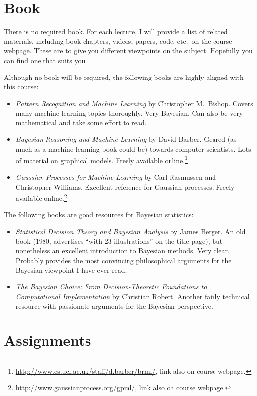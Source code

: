 \documentclass{article}
\begin{document}
\section*{Book}

There is no required book. For each lecture, I will provide a list of
related materials, including book chapters, videos, papers, code,
etc.\ on the course webpage.  These are to give you different
viewpoints on the subject.  Hopefully you can find one that suits you.

Although no book will be required, the following books are highly
aligned with this course:
\begin{itemize}
\item \emph{Pattern Recognition and Machine Learning} by Christopher
  M.\ Bishop.  Covers many machine-learning topics thoroughly.  Very
  Bayesian.  Can also be very mathematical and take some effort to
  read.
\item \emph{Bayesian Reasoning and Machine Learning} by David Barber.
  Geared (as much as a machine-learning book could be) towards
  computer scientists.  Lots of material on graphical models.  Freely
  available
  online.\footnote{\url{http://www.cs.ucl.ac.uk/staff/d.barber/brml/},
    link also on course webpage.}
\item \emph{Gaussian Processes for Machine Learning} by Carl Rasmussen
  and Christopher Williams.  Excellent reference for Gaussian
  processes.  Freely available
  online.\footnote{\url{http://www.gaussianprocess.org/gpml/}, link
    also on course webpage.}
\end{itemize}

The following books are good resources for Bayesian statistics:
\begin{itemize}
\item \emph{Statistical Decision Theory and Bayesian Analysis} by
  James Berger.  An old book (1980, advertises ``with 23
  illustrations'' on the title page), but nonetheless an excellent
  introduction to Bayesian methods.  Very clear.  Probably provides
  the most convincing philosophical arguments for the Bayesian
  viewpoint I have ever read.
\item \emph{The Bayesian Choice: From Decision-Theoretic Foundations
  to Computational Implementation} by Christian Robert.  Another
  fairly technical resource with passionate arguments for the
  Bayesian perspective.
\end{itemize}

\section*{Assignments}
\end{document}
